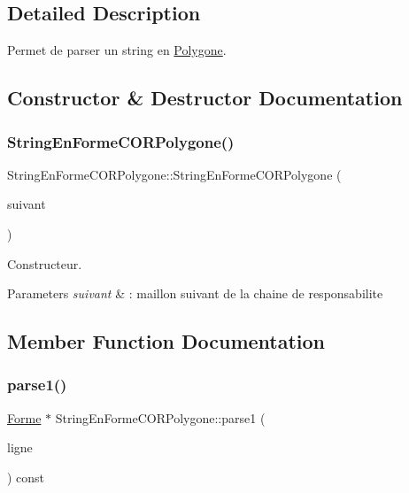 \subsection{Detailed Description}
Permet de parser un string en \mbox{\hyperlink{class_polygone}{Polygone}}. 

\subsection{Constructor \& Destructor Documentation}
\mbox{\label{class_string_en_forme_c_o_r_polygone_ad6bc42ef8a0cae88778fb316e5f75430}} 
\subsubsection{\texorpdfstring{StringEnFormeCORPolygone()}{StringEnFormeCORPolygone()}}
{\footnotesize\ttfamily String\+En\+Forme\+C\+O\+R\+Polygone\+::\+String\+En\+Forme\+C\+O\+R\+Polygone (\begin{DoxyParamCaption}\item[{\mbox{\hyperlink{class_string_en_forme_c_o_r}{String\+En\+Forme\+C\+OR}} $\ast$}]{suivant }\end{DoxyParamCaption})\hspace{0.3cm}{\ttfamily [inline]}}



Constructeur. 


\begin{DoxyParams}{Parameters}
{\em suivant} & \+: maillon suivant de la chaine de responsabilite \\
\hline
\end{DoxyParams}


\subsection{Member Function Documentation}
\mbox{\label{class_string_en_forme_c_o_r_polygone_a55ec921cc3af81bbe77737819c5449b7}} 
\subsubsection{\texorpdfstring{parse1()}{parse1()}}
{\footnotesize\ttfamily \mbox{\hyperlink{class_forme}{Forme}} $\ast$ String\+En\+Forme\+C\+O\+R\+Polygone\+::parse1 (\begin{DoxyParamCaption}\item[{const string \&}]{ligne }\end{DoxyParamCaption}) const\hspace{0.3cm}{\ttfamily [virtual]}}



